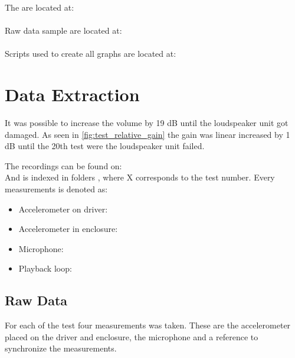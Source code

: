 The  are located at:\\
\\
Raw data sample are located at:\\
\\
Scripts used to create all graphs are located at:\\


%



\section{Data Extraction}


It was possible to increase the volume by 19 dB until the loudspeaker unit got damaged. As seen in \autoref{fig:test_relative_gain} the gain was linear increased by 1 dB until the 20th test were the loudspeaker unit failed.

The recordings can be found on:\\
And is indexed in folders , where X corresponds to the test number. Every measurements is denoted as:
\begin{itemize}
\item Accelerometer on driver: 
\item Accelerometer in enclosure: 
\item Microphone: 
\item Playback loop: 
\end{itemize}

\subsection{Raw Data}

For each of the test four measurements was taken. These are the accelerometer placed on the driver and enclosure, the microphone and a reference to synchronize the measurements. 

